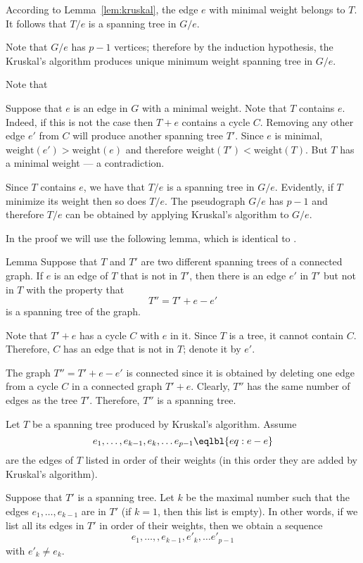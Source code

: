 According to Lemma~\ref{lem:kruskal}, the edge $e$ with minimal weight belongs to $T$. 
It follows that $T/e$ is a spanning tree in $G/e$.

Note that $G/e$ has $p-1$ vertices;
therefore by the induction hypothesis, the Kruskal's algorithm produces unique minimum weight spanning tree in $G/e$.

Note that 


Suppose that $e$ is an edge in $G$ with a minimal weight.
Note that $T$ contains $e$.
Indeed, if this is not the case then $T+e$ contains a cycle $C$.
Removing any other edge $e'$ from $C$ will produce another spanning tree $T'$.
Since $e$ is minimal, $\mathrm{weight}(e')>\mathrm{weight}(e)$ and therefore $\mathrm{weight}(T')<\mathrm{weight}(T)$.
But $T$ has a minimal weight --- a contradiction.

Since $T$ contains $e$, we have that $T/e$ is a spanning tree in $G/e$.
Evidently, if $T$ minimize its weight then so does $T/e$.
The pseudograph $G/e$ has $p-1$ and therefore $T/e$ can be obtained by applying Kruskal’s algorithm to $G/e$.
\qeds
\qeds

In the proof we will use the following lemma, which is identical to \cite[Exercises 7.1.6]{hartsfield-ringel}. 

\begin{thm}{Lemma}\label{lem:T+e-e}
Suppose that $T$ and $T'$ are two different spanning trees of a connected
graph. 
If $e$ is an edge of $T$ that is not in $T'$, then there is an edge $e'$
in $T'$ but not in $T$ with the property that 
\[T''=T' + e - e'\]
is a spanning tree of the
graph.
\end{thm}

Note that $T' + e$ has a cycle $C$ with $e$ in it.
Since $T$ is a tree, it cannot contain $C$.
Therefore, $C$ has an edge that is not in $T$;
denote it by $e'$.

The graph $T''=T' + e-e'$ is connected since it is obtained by deleting one edge from a cycle $C$ in a connected graph $T' + e$.
Clearly, $T''$ has the same number of edges as the tree $T'$.
Therefore, $T''$ is a spanning tree.
\qeds

Let $T$ be a spanning tree produced by Kruskal’s algorithm.
Assume 
\[e_1,\dots,e_{k-1},e_k,\dots e_{p-1}\eqlbl{eq:e-e}\] 
are the edges of $T$ listed in order of their weights
(in this order they are added by Kruskal’s algorithm).

Suppose that $T'$ is a spanning tree.
Let $k$ be the maximal number such that the edges  $e_1,\dots,e_{k-1}$ are in $T'$ (if $k=1$, then this list is empty). 
In other words, if we list all its edges in $T'$ in order of their weights, then 
we obtain a sequence 
\[e_1,\dots,,e_{k-1},e'_k,\dots e'_{p-1}\]
with $e'_k\ne e_k$.

